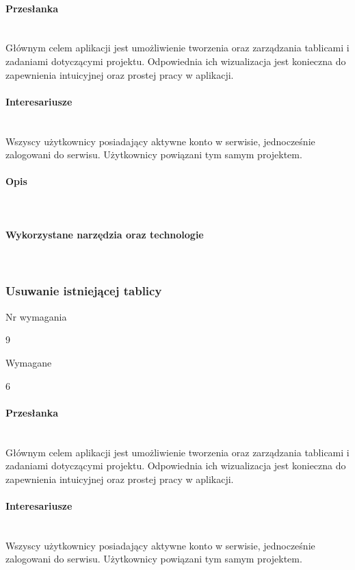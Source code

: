 \documentclass[eng,printmode]{mgr}
\begin{document}
\paragraph{Przesłanka}\ \\
Głównym celem aplikacji jest umożliwienie tworzenia oraz zarządzania tablicami i zadaniami dotyczącymi projektu. Odpowiednia ich wizualizacja jest konieczna do zapewnienia intuicyjnej oraz prostej pracy w aplikacji.

\paragraph{Interesariusze}\ \\
Wszyscy użytkownicy posiadający aktywne konto w serwisie, jednocześnie zalogowani do serwisu. Użytkownicy powiązani tym samym projektem.

\paragraph{Opis}\ \\

\paragraph{Wykorzystane narzędzia oraz technologie}\ \\
\newpage

\subsubsection{Usuwanie istniejącej tablicy}
\begin{labeling}{Nr wymagania}
\item [Nr wymagania:] 9
\item [Typ:] Wymagane
\item [Powiązania:] 6
\end{labeling}

\paragraph{Przesłanka}\ \\
Głównym celem aplikacji jest umożliwienie tworzenia oraz zarządzania tablicami i zadaniami dotyczącymi projektu. Odpowiednia ich wizualizacja jest konieczna do zapewnienia intuicyjnej oraz prostej pracy w aplikacji.

\paragraph{Interesariusze}\ \\
Wszyscy użytkownicy posiadający aktywne konto w serwisie, jednocześnie zalogowani do serwisu. Użytkownicy powiązani tym samym projektem.
\end{document}
